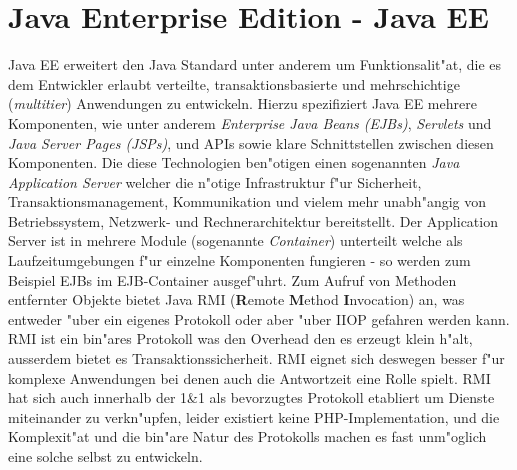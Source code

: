 \section{Java Enterprise Edition - Java EE}
\label{sec:background:jboss}
\label{sec:background:rmi}
Java EE \cite{JEEHP} erweitert den Java Standard unter anderem um Funktionsalit"at, die es dem Entwickler erlaubt verteilte, transaktionsbasierte und
mehrschichtige (\emph{multitier}) Anwendungen zu entwickeln. Hierzu spezifiziert Java EE mehrere Komponenten, wie unter anderem
\emph{Enterprise Java Beans (EJBs)}, \emph{Servlets} und \emph{Java Server Pages (JSPs)}, und APIs sowie klare Schnittstellen zwischen
diesen Komponenten. Die diese Technologien ben"otigen einen sogenannten \emph{Java Application Server} welcher die n"otige Infrastruktur
f"ur Sicherheit, Transaktionsmanagement, Kommunikation und vielem mehr unabh"angig von Betriebssystem, Netzwerk- und Rechnerarchitektur
bereitstellt. Der Application Server ist in mehrere Module (sogenannte \emph{Container}) unterteilt welche als Laufzeitumgebungen f"ur einzelne
Komponenten fungieren - so werden zum Beispiel EJBs im EJB-Container ausgef"uhrt. Zum Aufruf von Methoden entfernter Objekte bietet Java 
RMI (\textbf{R}emote \textbf{M}ethod \textbf{I}nvocation) an, was entweder "uber ein eigenes Protokoll oder aber "uber IIOP gefahren werden kann.
RMI ist ein bin"ares Protokoll was den Overhead den es erzeugt klein h"alt, ausserdem bietet es Transaktionssicherheit. RMI eignet sich deswegen besser f"ur 
komplexe Anwendungen bei denen auch die Antwortzeit eine Rolle spielt. RMI hat sich auch innerhalb der 1\&1 als bevorzugtes Protokoll 
etabliert um Dienste miteinander zu verkn"upfen, leider existiert keine PHP-Implementation, und die Komplexit"at und die bin"are Natur des
Protokolls machen es fast unm"oglich eine solche selbst zu entwickeln.


